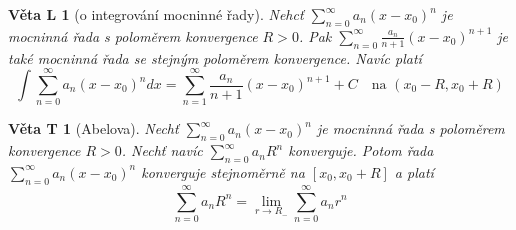 \documentclass[11pt,a4paper]{article}
\newcounter{vety}
\newtheorem{vetal}[vety]{Věta L}
\newtheorem{vetat}[vety]{Věta T}
\begin{document}
\begin{vetal}[o integrování mocninné řady]
Nehcť $\sum_{n=0}^{\infty} a_n (x-x_0)^n$ je mocninná řada s poloměrem konvergence $R > 0$. Pak $\sum_{n=0}^{\infty} \frac{a_n}{n+1} \left(x-x_0 \right)^{n+1}$ je také mocninná řada se stejným poloměrem konvergence. Navíc platí
$$\int \sum_{n=0}^{\infty} a_n (x-x_0)^n dx = \sum_{n=1}^{\infty} \frac{a_n}{n+1} \left( x-x_0 \right)^{n+1} + C  \quad \textrm{na } \left( x_0 - R, x_0 + R \right)$$
\end{vetal}

\begin{vetat}[Abelova]
Nechť $\sum_{n=0}^{\infty} a_n (x-x_0)^n$ je mocninná řada s poloměrem konvergence $R > 0$. Nechť navíc $\sum_{n=0}^{\infty} a_n R^n$ konverguje. Potom řada $\sum_{n=0}^{\infty} a_n (x-x_0)^n$ konverguje stejnoměrně na $[ x_0, x_0 + R ]$ a platí
$$\sum_{n=0}^{\infty} a_n R^n = \lim_{r \rightarrow R_-} \sum_{n=0}^{\infty} a_n r^n$$
\end{vetat}
\end{document}
